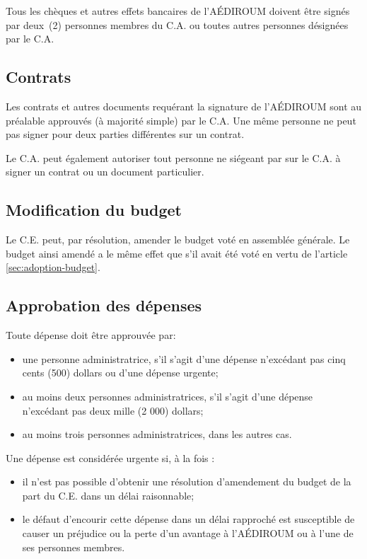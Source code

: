 \documentclass{aediroum}
\newcommand{\article}[1]{article \ref{#1}}
\begin{document}
Tous les chèques et autres effets bancaires de l'AÉDIROUM doivent être signés par deux~(2) personnes membres du C.A. ou toutes autres personnes désignées par le C.A.

\subsection{Contrats}\label{sec:contrats}

Les contrats et autres documents requérant la signature de l'AÉDIROUM sont au préalable approuvés (à majorité simple) par le C.A. Une même personne ne peut pas signer pour deux parties différentes sur un contrat.

Le C.A. peut également autoriser tout personne ne siégeant par sur le C.A. à signer un contrat ou un document particulier.

\subsection{Modification du budget}\label{sec:modification-budget}

Le C.E. peut, par résolution, amender le budget voté en assemblée générale. Le budget ainsi amendé a le même effet que s'il avait été voté en vertu de l'\article{sec:adoption-budget}.

\subsection{Approbation des dépenses}\label{sec:approbation-des-depenses}

Toute dépense doit être approuvée par:

\begin{itemize}
    \item une personne administratrice, s’il s’agit d’une dépense n’excédant pas cinq cents (500) dollars ou d’une dépense urgente;
    \item au moins deux personnes administratrices, s’il s’agit d’une dépense n’excédant pas deux mille (2 000) dollars;
    \item au moins trois personnes administratrices, dans les autres cas.
\end{itemize}

Une dépense est considérée urgente si, à la fois :

\begin{itemize}
    \item il n'est pas possible d'obtenir une résolution d'amendement du budget de la part du C.E. dans un délai raisonnable;
    \item le défaut d'encourir cette dépense dans un délai rapproché est susceptible de causer un préjudice ou la perte d'un avantage à l'AÉDIROUM ou à l'une de ses personnes membres.
\end{itemize}
\end{document}
